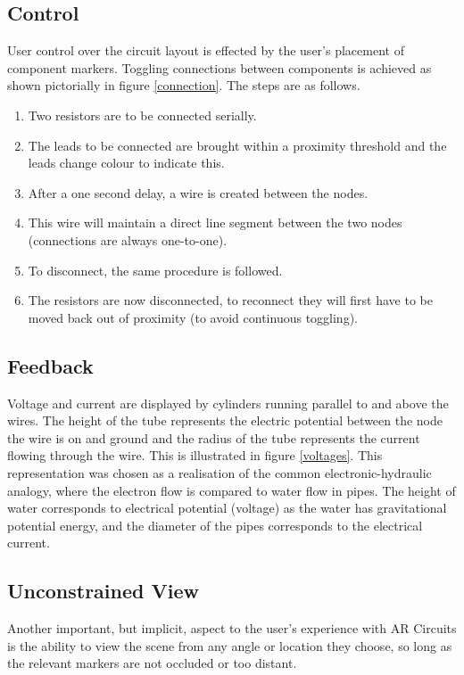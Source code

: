 \subsection{Control}
User control over the circuit layout is effected by the user's placement of component
markers. Toggling connections between components is achieved as shown
pictorially in figure \ref{connection}. The steps are as follows.
\begin{enumerate}
\item Two resistors are to be connected serially.
\item The leads to be connected are brought within a proximity threshold and the
leads change colour to indicate this.
\item After a one second delay, a wire is created between the nodes.
\item This wire will maintain a direct line segment between the two nodes
(connections are always one-to-one).
\item To disconnect, the same procedure is followed.
\item The resistors are now disconnected, to reconnect they will first have to
be moved back out of proximity (to avoid continuous toggling).
\end{enumerate}

\subsection{Feedback}
Voltage and current are displayed by cylinders running parallel to and above
the wires. The height of the tube represents the electric potential between the
node the wire is on and ground and the radius of the tube represents the current
flowing through the wire. This is illustrated in figure \ref{voltages}. This 
representation was chosen as a realisation of the common electronic-hydraulic
analogy, where the electron flow is compared to water flow in pipes. The height
of water corresponds to electrical potential (voltage) as the water has gravitational
potential energy, and the diameter of the pipes corresponds to the electrical
current.


\subsection{Unconstrained View}
Another important, but implicit, aspect to the
user's experience with AR Circuits is the ability to view the scene from any
angle or location they choose, so long as the relevant markers are not occluded
or too distant.

